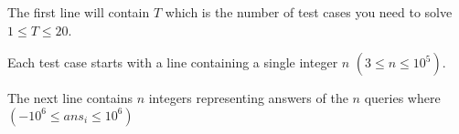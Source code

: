 The first line will contain $T$  which is the number of test cases you need to solve $1 \le T \le 20$.

Each test case starts with a line containing a single integer $n$ $(3 \le n \le 10^{5})$.

The next line contains $n$ integers representing answers of the $n$ queries where $(-10^{6} \leq ans_i \le 10^{6})$
